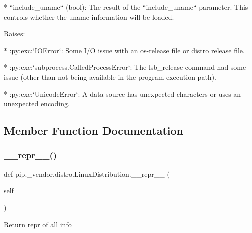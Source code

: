 \begin{DoxyVerb}
* ``include_uname`` (bool): The result of the ``include_uname``
  parameter. This controls whether the uname information will
  be loaded.

Raises:

* :py:exc:`IOError`: Some I/O issue with an os-release file or distro
  release file.

* :py:exc:`subprocess.CalledProcessError`: The lsb_release command had
  some issue (other than not being available in the program execution
  path).

* :py:exc:`UnicodeError`: A data source has unexpected characters or
  uses an unexpected encoding.
\end{DoxyVerb}
 

\subsection{Member Function Documentation}
\mbox{\label{classpip_1_1__vendor_1_1distro_1_1LinuxDistribution_a88c8c00cbb4c36365cf60754c3bdc5fa}} 
\subsubsection{\texorpdfstring{\+\_\+\+\_\+repr\+\_\+\+\_\+()}{\_\_repr\_\_()}}
{\footnotesize\ttfamily def pip.\+\_\+vendor.\+distro.\+Linux\+Distribution.\+\_\+\+\_\+repr\+\_\+\+\_\+ (\begin{DoxyParamCaption}\item[{}]{self }\end{DoxyParamCaption})}

\begin{DoxyVerb}Return repr of all info
\end{DoxyVerb}
 \mbox{\label{classpip_1_1__vendor_1_1distro_1_1LinuxDistribution_a6f133fc881eea68a8fd21dde923639f3}} 
